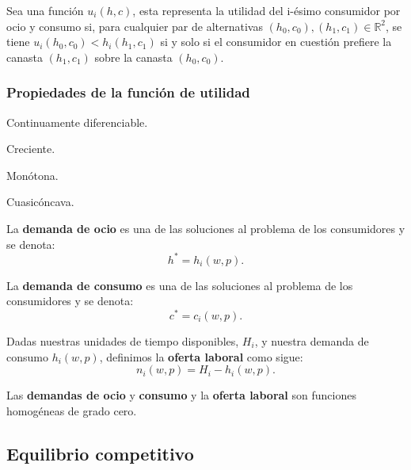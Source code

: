 \documentclass[8pt,a4paper]{extarticle}
\begin{document}
\begin{multicols}{3}
	\begin{boxdef}
		Sea una función $u_i(h, c)$, esta representa la utilidad del i-ésimo  consumidor por ocio y consumo si, para cualquier par de alternativas $(h_0, c_0), (h_1, c_1) \in \mathbb{R}^2$, se tiene $u_i(h_0, c_0) < h_i(h_1, c_1)$ si y solo si  el consumidor en cuestión prefiere la canasta $(h_1, c_1)$ sobre la canasta $(h_0, c_0)$.
	\end{boxdef}

	\subsubsection*{Propiedades de la función de utilidad}

	\begin{eqlist}
		\item Continuamente diferenciable.
		\item Creciente.
		\item Monótona.
		\item Cuasicóncava.
	\end{eqlist}

	\begin{boxdef}
		La \textbf{demanda de ocio} es una de las soluciones al problema de los consumidores y se denota:
		\[
			h^* = h_i(w, p)
			.\]
	\end{boxdef}

	\begin{boxdef}
		La \textbf{demanda de consumo} es una de las soluciones al problema de los consumidores y se denota:
		\[
			c^* = c_i(w, p)
			.\]
	\end{boxdef}

	\begin{boxdef}
		Dadas nuestras unidades de tiempo disponibles, $H_i$, y nuestra demanda de consumo $h_i(w, p)$, definimos la \textbf{oferta laboral} como sigue:
		\[
			n_i(w, p) = H_i - h_i(w, p)
			.\]
	\end{boxdef}

	\begin{boxprop}
		Las \textbf{demandas de ocio} y \textbf{consumo} y la \textbf{oferta laboral} son funciones homogéneas de grado cero.
	\end{boxprop}

	\subsection{Equilibrio competitivo}


\end{multicols}
\end{document}
